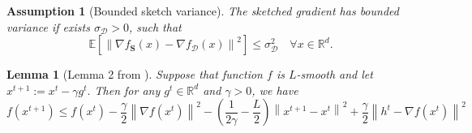 \documentclass{article}
\newtheorem{assumption}{Assumption}
\newtheorem{lemma}{Lemma}
\theoremstyle{plain}
\theoremstyle{plain}
\theoremstyle{definition}
\theoremstyle{remark}
\begin{document}
\begin{assumption}[Bounded sketch variance]
\label{ass:bounded-variance}
    The sketched gradient has bounded variance if exists $\sigma_{\mathcal{D}} > 0$, such that
   $$ \mathbb{E}\left[\left\|\nabla f_{\mathbf{S}}\left(x\right)-\nabla f_{\mathcal{D}}\left(x\right)\right\|^2\right] \leq \sigma_{\mathcal{D}}^2 \quad \forall x \in \mathbb{R}^d.$$
\end{assumption}

\begin{lemma}[Lemma 2 from \citep{PAGE2021}]
Suppose that function $f$ is  $L$-smooth and let $x^{t+1}:=x^t-\gamma g^t.$ Then for any $g^t \in \mathbb{R}^d$ and $\gamma>0$, we have
   \begin{equation}
       f\left(x^{t+1}\right) \leq f\left(x^t\right)-\frac{\gamma}{2}\left\|\nabla f(x^t)\right\|^2-\left(\frac{1}{2 \gamma}-\frac{L}{2}\right)\left\|x^{t+1}-x^t\right\|^2+\frac{\gamma}{2}\left\|h^t-\nabla f (x^t)\right\|^2
   \end{equation}
\end{lemma}
\end{document}
